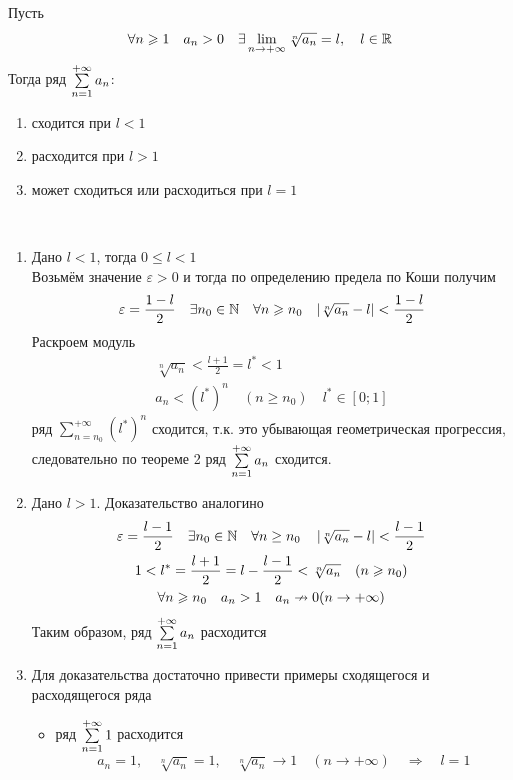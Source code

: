 \begin{Th}~\\
	Пусть 
    \[
        \forall n \geqslant 1 \quad a_n > 0 \quad \exists \lim_{n \to +\infty}\sqrt[n]{a_n} = l, \quad l \in \mathbb{R}
    \] 
    Тогда ряд $\sum\limits_{n = 1}^{+\infty}{a_n}$:
	\begin{enumerate}
		\item сходится при $l < 1$  
		\item расходится при $l > 1$
		\item может сходиться или расходиться при $l = 1$
	\end{enumerate}
\end{Th}

\begin{Proof}~
	\begin{enumerate}
		\item Дано $l < 1$, тогда $0 \leqslant l < 1$\\
        Возьмём значение $\varepsilon > 0$ и тогда по определению предела по Коши получим
        \[
            \varepsilon = \frac{1-l}{2} \quad \exists n_0 \in \mathbb{N} \quad \forall n \geqslant n_0 \quad |\sqrt[n]{a_n} - l| < \frac{1-l}{2}
        \]
        Раскроем модуль
        \begin{gather*}
            \sqrt[n]{a_n} < \frac{l+1}{2} = l^{\ast} < 1\\
            a_n < (l^{\ast})^n \quad (n \geqslant n_0) \quad l^{\ast} \in [0;1]
        \end{gather*}
		ряд $\sum\limits_{n = n_0}^{+\infty}(l^{\ast})^n$ сходится, т.к. это убывающая геометрическая прогрессия, следовательно по теореме 2 ряд $\sum\limits_{n = 1}^{+\infty}{a_n}$ сходится.
        
		\item Дано $l > 1$. Доказательство аналогино
        \begin{gather*}
            \varepsilon = \frac{l-1}{2} \quad \exists n_0 \in \mathbb{N} \quad \forall n \geq n_0 \quad \left|\sqrt[n]{a_n} - l\right| < \frac{l-1}{2}\\
            1 < l^{\ast} = \frac{l+1}{2} = l - \frac{l-1}{2} < \sqrt[n]{a_n} \quad (n \geqslant n_0)\\
            \forall n \geqslant n_0 \quad a_n > 1 \quad a_n \nrightarrow 0 (n \to +\infty)
        \end{gather*}
        Таким образом, ряд $\sum\limits_{n = 1}^{+\infty}{a_n}$ расходится
		
        \item Для доказательства достаточно привести примеры сходящегося и расходящегося ряда
		\begin{itemize}
			\item ряд $\sum\limits_{n = 1}^{+\infty}{1}$ расходится
            \[
                a_n = 1, \quad \sqrt[n]{a_n} = 1, \quad \sqrt[n]{a_n} \to 1 \quad (n \to +\infty) \quad \Rightarrow \quad l=1
            \]
			

\end{itemize}
\end{enumerate}
\end{Proof}
